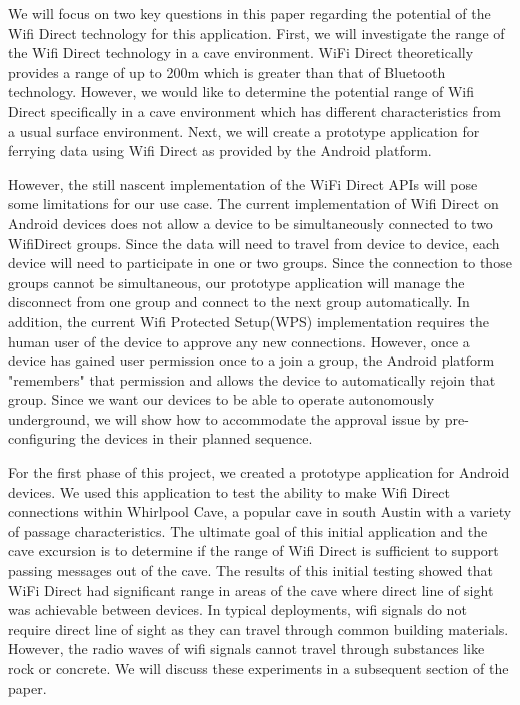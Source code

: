 \documentclass[10pt,twocolumn]{article}
\begin{document}
We will focus on two key questions in this paper regarding the potential of the Wifi Direct technology for this application.
First, we will investigate the range of the Wifi Direct technology in a cave environment.
WiFi Direct theoretically provides a range of up to 200m which is greater than that of Bluetooth technology. 
However, we would like to determine the potential range of Wifi Direct specifically in a cave environment which has different characteristics from a usual surface environment. 
Next, we will create a prototype application for ferrying data using Wifi Direct as provided by the Android platform. 

However, the still nascent implementation of the WiFi Direct APIs will pose some limitations for our use case.
The current implementation of Wifi Direct on Android devices does not allow a device to be simultaneously connected to two WifiDirect groups.
Since the data will need to travel from device to device, each device will need to participate in one or two groups. 
Since the connection to those groups cannot be simultaneous, our prototype application will manage the disconnect from one group and connect to the next group automatically.
In addition, the current Wifi Protected Setup(WPS) implementation requires the human user of the device to approve any new connections.
However, once a device has gained user permission once to a join a group, the Android platform "remembers" that permission and allows the device to automatically rejoin that group.
Since we want our devices to be able to operate autonomously underground, we will show how to accommodate the approval issue by pre-configuring the devices in their planned sequence.
 
For the first phase of this project, we created a prototype application for Android devices. 
We used this application to test the ability to make Wifi Direct connections within Whirlpool Cave, a popular cave in south Austin with a variety of passage characteristics. 
The ultimate goal of this initial application and the cave excursion is to determine if the range of Wifi Direct is sufficient to support passing messages out of the cave.
The results of this initial testing showed that WiFi Direct had significant range in areas of the cave where direct line of sight was achievable between devices.
In typical deployments, wifi signals do not require direct line of sight as they can travel through common building materials.
However, the radio waves of wifi signals cannot travel through substances like rock or concrete.
We will discuss these experiments in a subsequent section of the paper.
\end{document}
